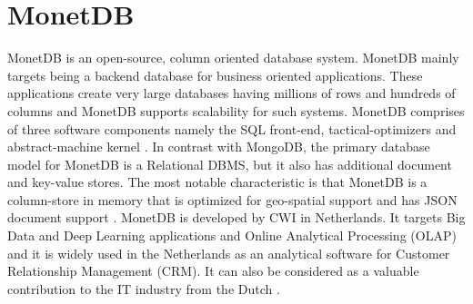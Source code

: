\section{MonetDB}

MonetDB is an open-source, column oriented database system. MonetDB mainly 
targets being a backend database for business oriented applications. These 
applications create very large databases having millions of rows and hundreds 
of columns and MonetDB supports scalability for such systems. MonetDB comprises 
of three software components namely the SQL front-end, tactical-optimizers and 
abstract-machine kernel \cite{hid-sp18-416-www-monetdb-features}. In contrast 
with MongoDB, the primary database model for MonetDB is a Relational DBMS, but 
it also has additional document and key-value stores. The most notable 
characteristic is that MonetDB is a column-store in memory that is optimized 
for geo-spatial support and has JSON document support 
\cite{hid-sp18-416-www-monetdb-mongodb-comparison}. MonetDB is developed by CWI 
in Netherlands. It targets Big Data and Deep Learning applications and Online 
Analytical Processing (OLAP) and it is widely used in the Netherlands as an 
analytical software for Customer Relationship Management (CRM). It can also be 
considered as a valuable contribution to the IT industry from the Dutch 
\cite{hid-sp18-416-www-monetdb-dutch}.